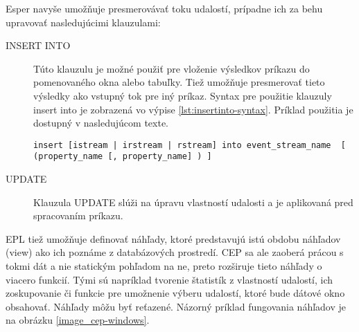 		Esper navyše umožňuje presmerovávať toku udalostí, prípadne ich za behu upravovať nasledujúcimi klauzulami:
		\begin{description}
			\item[INSERT INTO] Túto klauzulu je možné použiť pre vloženie výsledkov príkazu do pomenovaného okna alebo tabuľky. Tiež umožňuje presmerovať tieto výsledky ako vstupný tok pre iný príkaz. Syntax pre použitie klauzuly insert into je zobrazená vo výpise \ref{lst:insertinto-syntax}. Príklad použitia je dostupný v nasledujúcom texte.
			\begin{lstlisting}[label=lst:insertinto-syntax,caption=Syntax INSERT INTO klauzuly \cite{web:esper-doc}]
			insert [istream | irstream | rstream] into event_stream_name  [ (property_name [, property_name] ) ]
			\end{lstlisting}
			\item[UPDATE] Klauzula UPDATE slúži na úpravu vlastností udalosti a je aplikovaná pred spracovaním príkazu.
		\end{description}

		EPL tiež umožňuje definovať náhľady, ktoré predstavujú istú obdobu náhľadov (view) ako ich poznáme z databázových prostredí. CEP sa ale zaoberá prácou s tokmi dát a nie statickým pohľadom na ne, preto rozširuje tieto náhľady o viacero funkcií. Tými sú napríklad tvorenie štatistík z vlastností udalostí, ich zoskupovanie či funkcie pre umožnenie výberu udalostí, ktoré bude dátové okno obsahovať. Náhľady môžu byť reťazené. Názorný príklad fungovania náhľadov je na obrázku \ref{image_cep-windows}.
	

